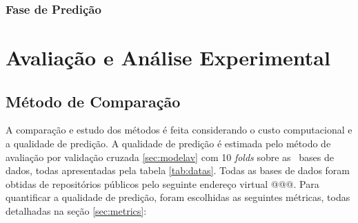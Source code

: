  


 
 \subsection{Fase de Predição}
 
 


%    
%    
%    
%    

 



\chapter{Avaliação e Análise Experimental}
\section{Método de Comparação}
\label{sec:methodcomp}

A comparação e estudo dos métodos é feita considerando o custo computacional e a qualidade de predição.
A qualidade de predição é estimada pelo método de avaliação por validação cruzada \ref{sec:modelav} com 10 \textit{folds}
sobre as \Nbases~bases de dados, todas apresentadas pela tabela \ref{tab:datas}.
Todas as bases de dados foram obtidas de repositórios públicos pelo seguinte
endereço virtual @@@.
Para quantificar a qualidade de predição, foram escolhidas as seguintes métricas, todas detalhadas na seção \ref{sec:metrics}:

